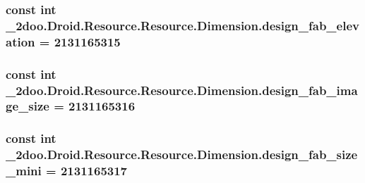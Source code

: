 \hypertarget{class__2doo_1_1_droid_1_1_resource_1_1_dimension_77650fd0cd0d78c130fcd59ae70ab365}{
\subsubsection[{design\_\-fab\_\-elevation}]{\setlength{\rightskip}{0pt plus 5cm}const int \_\-2doo.Droid.Resource.Resource.Dimension.design\_\-fab\_\-elevation = 2131165315}}
\label{class__2doo_1_1_droid_1_1_resource_1_1_dimension_77650fd0cd0d78c130fcd59ae70ab365}


\hypertarget{class__2doo_1_1_droid_1_1_resource_1_1_dimension_b02454c191f079239ed466354197591b}{
\subsubsection[{design\_\-fab\_\-image\_\-size}]{\setlength{\rightskip}{0pt plus 5cm}const int \_\-2doo.Droid.Resource.Resource.Dimension.design\_\-fab\_\-image\_\-size = 2131165316}}
\label{class__2doo_1_1_droid_1_1_resource_1_1_dimension_b02454c191f079239ed466354197591b}


\hypertarget{class__2doo_1_1_droid_1_1_resource_1_1_dimension_e87534714718a4784225f66ad51caead}{
\subsubsection[{design\_\-fab\_\-size\_\-mini}]{\setlength{\rightskip}{0pt plus 5cm}const int \_\-2doo.Droid.Resource.Resource.Dimension.design\_\-fab\_\-size\_\-mini = 2131165317}}
\label{class__2doo_1_1_droid_1_1_resource_1_1_dimension_e87534714718a4784225f66ad51caead}


